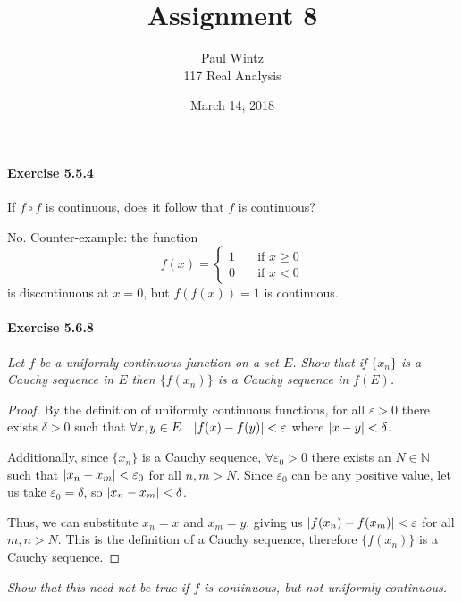 \documentclass[11pt]{article}
\title{Assignment 8}
\author{Paul Wintz\\117 Real Analysis}
\date{March 14, 2018}
\DeclarePairedDelimiter{\abs}{\lvert}{\rvert}
\def \N {\mathbb{N}}
\def \epsilon {\varepsilon}
\newcommand{\set}[1]{\{#1\}}
\def \xn {x_n}
\begin{document}
\maketitle

\paragraph{Exercise 5.5.4} If $f \circ f$ is continuous, does it follow that $f$ is continuous?

No. Counter-example: the function 
$$ f(x) =
	\begin{cases}
	1 & \quad \text{if } x \geq 0 \\
	0 & \quad \text{if } x < 0
	\end{cases}
$$
is discontinuous at $x = 0$, but $f(f(x)) = 1$ is continuous.

\paragraph{Exercise 5.6.8} \textit{Let $f$ be a uniformly continuous function on a set $E$. Show that if $\{x_n\}$ is a Cauchy sequence in $E$ then $\{f(x_n)\}$ is a Cauchy sequence in $f(E)$.}

\begin{proof}
	By the definition of uniformly continuous functions, for all $ \epsilon > 0 $ there exists $\delta > 0 $ such that $\forall x, y \in E \quad \abs*{f(x) - f(y)} < \epsilon $ where $ \abs*{x - y} < \delta$.
	
	Additionally, since $\set{\xn}$ is a Cauchy sequence, $\forall \epsilon_0 > 0$ there exists an $ N \in \N$ such that $ \abs{\xn - x_m} < \epsilon_0 $ for all $n, m > N$. Since $ \epsilon_0$ can be any positive value, let us take $ \epsilon_0 = \delta $, so $ \abs{\xn - x_m} < \delta $.
	
	Thus, we can substitute $\xn = x$ and $x_m = y$, giving us $\abs{f(\xn) - f(x_m)} < \epsilon$ for all $m, n > N$. This is the definition of a Cauchy sequence, therefore $\set{f(\xn)}$ is a Cauchy sequence.
\end{proof}

\def \xntozero {\lim_{\xn \to 0^+}}
\textit{Show that this need not be true if $f$ is continuous, but not uniformly continuous.}\newline
\end{document}
